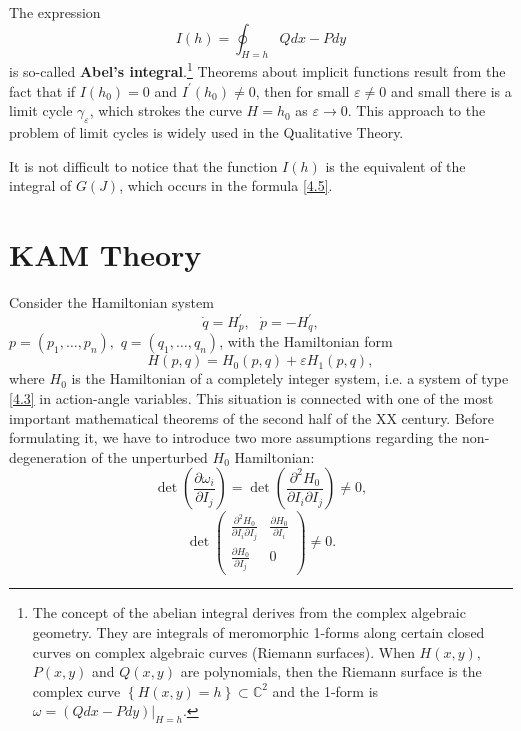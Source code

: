 \begin{example}
	The expression
	\begin{equation}
	\label{4.7}
	I(h)=\oint_{H=h}Qdx-Pdy
	\end{equation}
	is so-called \textbf{Abel's integral}.\footnote{The concept of the abelian integral derives from the complex algebraic geometry. They are integrals of meromorphic 1-forms along certain closed curves on complex algebraic curves (Riemann surfaces). When $H(x,y),$ $P(x,y)$ and $Q(x,y)$ are polynomials, then the Riemann surface is the complex curve $\left\{ H(x,y)=h\right\} \subset \mathbb{C}^{2}$ and the 1-form is $\omega = \left( Qdx-Pdy\right) |_{H=h}.$} Theorems about implicit functions result from the fact that if $I(h_{0})=0$ and $I^{\prime }(h_{0})\not=0$, then for small $\varepsilon \not=0$ and small there is a limit cycle $\gamma_{\varepsilon }$, which strokes the curve $H=h_{0}$ as $\varepsilon \rightarrow 0$. This approach to the problem of limit cycles is widely used in the Qualitative Theory.

	It is not difficult to notice that the function $I(h)$ is the equivalent of the integral of $G(J)$, which occurs in the formula \eqref{4.5}.
\end{example}

\section{KAM Theory}
Consider the Hamiltonian system
$$
\dot{q}=H_{p}^{\prime },\text{ \ \ \ }\dot{p}=-H_{q}^{\prime },
$$
$p=\left( p_{1},\ldots ,p_{n}\right) ,$ $q=\left( q_{1},\ldots ,q_{n}\right)$, with the Hamiltonian form
$$
H(p,q)=H_{0}(p,q)+\varepsilon H_{1}(p,q),
$$
where $H_{0}$ is the Hamiltonian of a completely integer system, i.e. a system of type \eqref{4.3} in action-angle variables. This situation is connected with one of the most important mathematical theorems of the second half of the XX century. Before formulating it, we have to introduce two more assumptions regarding the non-degeneration of the unperturbed $H_0$ Hamiltonian:
\begin{equation}
\label{4.8}
\det \left( \frac{\partial \omega _{i}}{\partial I_{j}}\right) =\det \left(
\frac{\partial ^{2}H_{0}}{\partial I_{i}\partial I_{j}}\right) \not=0,
\end{equation}%
\begin{equation}
\label{4.9}
\det 
\begin{pmatrix}
\frac{\partial ^{2}H_{0}}{\partial I_{i}\partial I_{j}} & \frac{\partial
	H_{0}}{\partial I_{i}} \\
\frac{\partial H_{0}}{\partial I_{j}} & 0%
\end{pmatrix} \neq 0.
\end{equation}

